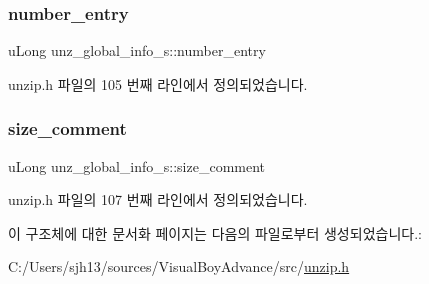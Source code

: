 \subsubsection{\texorpdfstring{number\+\_\+entry}{number\_entry}}
{\footnotesize\ttfamily u\+Long unz\+\_\+global\+\_\+info\+\_\+s\+::number\+\_\+entry}



unzip.\+h 파일의 105 번째 라인에서 정의되었습니다.

\mbox{\label{structunz__global__info__s_a10b58ab57b62301de813ecac0e974363}} 
\subsubsection{\texorpdfstring{size\+\_\+comment}{size\_comment}}
{\footnotesize\ttfamily u\+Long unz\+\_\+global\+\_\+info\+\_\+s\+::size\+\_\+comment}



unzip.\+h 파일의 107 번째 라인에서 정의되었습니다.



이 구조체에 대한 문서화 페이지는 다음의 파일로부터 생성되었습니다.\+:\begin{DoxyCompactItemize}
\item 
C\+:/\+Users/sjh13/sources/\+Visual\+Boy\+Advance/src/\mbox{\hyperlink{unzip_8h}{unzip.\+h}}\end{DoxyCompactItemize}
